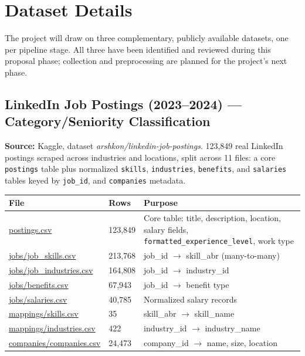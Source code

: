 \documentclass[11pt,a4paper]{article}
\begin{document}
\section{Dataset Details}
\label{sec:dataset}

The project will draw on three complementary, publicly available datasets, one per
pipeline stage. All three have been identified and reviewed during this proposal phase;
collection and preprocessing are planned for the project's next phase.

\subsection{LinkedIn Job Postings (2023--2024) --- Category/Seniority Classification}
\label{sec:dataset-linkedin}

\textbf{Source:} Kaggle, dataset \textit{arshkon/linkedin-job-postings}. 123{,}849 real
LinkedIn postings scraped across industries and locations, split across 11 files: a core
\texttt{postings} table plus normalized \texttt{skills}, \texttt{industries},
\texttt{benefits}, and \texttt{salaries} tables keyed by \texttt{job\_id}, and
\texttt{companies} metadata.

\begin{center}
\small
\begin{tabular}{@{}p{4.6cm}p{1.6cm}p{7cm}@{}}
\toprule
\textbf{File} & \textbf{Rows} & \textbf{Purpose} \\
\midrule
\url{postings.csv} & 123{,}849 & Core table: title, description, location, salary
fields, \texttt{formatted\_experience\_level}, work type \\[2pt]
\url{jobs/job_skills.csv} & 213{,}768 & job\_id $\to$ skill\_abr (many-to-many) \\[2pt]
\url{jobs/job_industries.csv} & 164{,}808 & job\_id $\to$ industry\_id \\[2pt]
\url{jobs/benefits.csv} & 67{,}943 & job\_id $\to$ benefit type \\[2pt]
\url{jobs/salaries.csv} & 40{,}785 & Normalized salary records \\[2pt]
\url{mappings/skills.csv} & 35 & skill\_abr $\to$ skill\_name \\[2pt]
\url{mappings/industries.csv} & 422 & industry\_id $\to$ industry\_name \\[2pt]
\url{companies/companies.csv} & 24{,}473 & company\_id $\to$ name, size, location \\
\bottomrule
\end{tabular}
\end{center}
\normalsize
\end{document}
